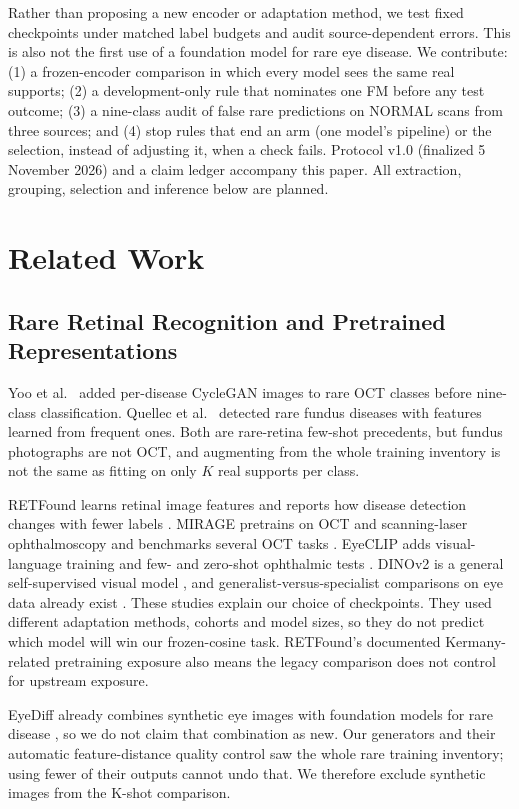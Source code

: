 \documentclass[conference]{IEEEtran}
\newcommand{\claim}[1]{} %
\begin{document}
\claim{C04}
Rather than proposing a new encoder or adaptation method, we test fixed checkpoints under matched label budgets and audit source-dependent errors. This is also not the first use of a foundation model for rare eye disease. We contribute: (1) a frozen-encoder comparison in which every model sees the same real supports; (2) a development-only rule that nominates one FM before any test outcome; (3) a nine-class audit of false rare predictions on NORMAL scans from three sources; and (4) stop rules that end an arm (one model's pipeline) or the selection, instead of adjusting it, when a check fails. Protocol v1.0 (finalized 5 November 2026) and a claim ledger accompany this paper. All extraction, grouping, selection and inference below are planned.

\section{Related Work}
\subsection{Rare Retinal Recognition and Pretrained Representations}
\claim{C05}
Yoo et al.\ \cite{Yoo2021} added per-disease CycleGAN images to rare OCT classes before nine-class classification. Quellec et al.\ \cite{Quellec2020} detected rare fundus diseases with features learned from frequent ones. Both are rare-retina few-shot precedents, but fundus photographs are not OCT, and augmenting from the whole training inventory is not the same as fitting on only $K$ real supports per class.

\claim{C06}
RETFound learns retinal image features and reports how disease detection changes with fewer labels \cite{RETFound2023}. MIRAGE pretrains on OCT and scanning-laser ophthalmoscopy and benchmarks several OCT tasks \cite{MIRAGE2025}. EyeCLIP adds visual-language training and few- and zero-shot ophthalmic tests \cite{EyeCLIP2025}. DINOv2 is a general self-supervised visual model \cite{DINOv2}, and generalist-versus-specialist comparisons on eye data already exist \cite{Generalist2025}. These studies explain our choice of checkpoints. They used different adaptation methods, cohorts and model sizes, so they do not predict which model will win our frozen-cosine task. RETFound's documented Kermany-related pretraining exposure also means the legacy comparison does not control for upstream exposure.

\claim{C07}
EyeDiff already combines synthetic eye images with foundation models for rare disease \cite{EyeDiff2026}, so we do not claim that combination as new. Our generators and their automatic feature-distance quality control saw the whole rare training inventory; using fewer of their outputs cannot undo that. We therefore exclude synthetic images from the K-shot comparison.
\end{document}
